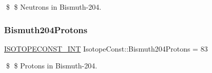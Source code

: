 \$ \$ Neutrons in Bismuth-\/204. \mbox{\label{group___isotope_const-_bismuth-_bi204_ga0a4d216dcfe088b589a454cf336d1ed2}} 
\subsubsection{\texorpdfstring{Bismuth204\+Protons}{Bismuth204Protons}}
{\footnotesize\ttfamily \mbox{\hyperlink{group___isotope_const-_macros_ga5f18360b3e99483a35c32d789e62621c}{I\+S\+O\+T\+O\+P\+E\+C\+O\+N\+S\+T\+\_\+\+I\+NT}} Isotope\+Const\+::\+Bismuth204\+Protons = 83}

\$ \$ Protons in Bismuth-\/204. 